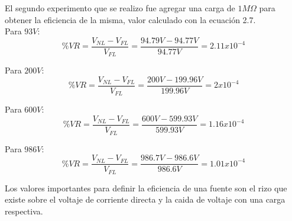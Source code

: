 El segundo experimento que se realizo fue agregar una carga de $1M\Omega$ para obtener la eficiencia de la misma, valor calculado con la ecuación 2.7. \\

Para $93V$: $$\%VR=\frac{V_{NL}-V_{FL}}{V_{FL}}=\frac{94.79V-94.77V}{94.77V}= 2.11x10^{-4}$$

Para $200V$: $$\%VR=\frac{V_{NL}-V_{FL}}{V_{FL}}=\frac{200V-199.96V}{199.96V}= 2x10^{-4}$$

Para $600V$: $$\%VR=\frac{V_{NL}-V_{FL}}{V_{FL}}=\frac{600V-599.93V}{599.93V}= 1.16x10^{-4}$$

Para $986V$: $$\%VR=\frac{V_{NL}-V_{FL}}{V_{FL}}=\frac{986.7V-986.6V}{986.6V}= 1.01x10^{-4}$$

Los valores importantes para definir la eficiencia de una fuente son el rizo que existe sobre el voltaje de corriente directa y la caida de voltaje con una carga respectiva. 

